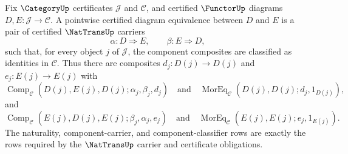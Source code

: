 
\begin{definition}
\label{def:catlimit-pointwise-certified-diagram-equivalence}
Fix $\CategoryUp$ certificates $\mathcal J$ and $\mathcal C$, and certified $\FunctorUp$ diagrams $D,E:\mathcal J\to\mathcal C$. A pointwise certified diagram equivalence between $D$ and $E$ is a pair of certified $\NatTransUp$ carriers
$$
\alpha:D\Rightarrow E,\qquad \beta:E\Rightarrow D,
$$
such that, for every object $j$ of $\mathcal J$, the component composites are classified as identities in $\mathcal C$. Thus there are composites $d_j:D(j)\to D(j)$ and $e_j:E(j)\to E(j)$ with
$$
\operatorname{Comp}_{\mathcal C}(D(j),E(j),D(j);\alpha_j,\beta_j,d_j)
\quad\text{and}\quad
\operatorname{MorEq}_{\mathcal C}(D(j),D(j);d_j,1_{D(j)}),
$$
and
$$
\operatorname{Comp}_{\mathcal C}(E(j),D(j),E(j);\beta_j,\alpha_j,e_j)
\quad\text{and}\quad
\operatorname{MorEq}_{\mathcal C}(E(j),E(j);e_j,1_{E(j)}).
$$
The naturality, component-carrier, and component-classifier rows are exactly the rows required by the $\NatTransUp$ carrier and certificate obligations.
\end{definition}

